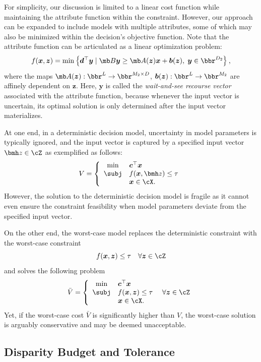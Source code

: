 \documentclass[opre, blindrev]{informs4}
\newcommand{\1}[1]{\mathds{1}{\left(#1\right)}}
\begin{document}
For simplicity, our discussion is limited to a linear cost function while maintaining the attribute function within the constraint. However, our approach can be expanded to include models with multiple attributes, some of which may also be minimized within the decision's objective function. Note that the attribute function can be articulated as a linear optimization problem:
$$
f(\bm x, \bm z) = \min\left\{ \bm d^\top \bm y \;|\; \mb B \bm y \geq \mb A(\bm z) \bm x + \bm b(\bm z), \; \bm y \in \bbr^{D_2} \right\},
$$
where the maps $\mb A(\bm z):\bbr^{L}\rightarrow \bbr^{M_2\times D}$, $\bm b(\bm z):\bbr^{L}\rightarrow \bbr^{M_2}$ are affinely dependent on $\bm z$. Here, $\bm y$ is called the \textit{wait-and-see recourse vector} associated with the attribute function, because whenever the input vector is uncertain, its optimal solution is only determined after the input vector materializes.  

At one end, in a deterministic decision model, uncertainty in model parameters is typically ignored, and the input vector is captured by a specified input vector $\bmh z \in \cZ$ as exemplified as follows:
\begin{equation}
\label{mod:DetermisticModel}
V = \left\{
\begin{array}{cl}
\min & \bm c^\top \bm x \\
\subj & f(\bm x,\bmh z) \leq \tau \\
&\bm x \in \cX.
\end{array}
\right.
\end{equation}
However, the solution to the deterministic decision model is fragile as it cannot even ensure the constraint feasibility when model parameters deviate from the specified input vector. 

On the other end, the worst-case model replaces the deterministic constraint with the worst-case constraint
\[
f(\bm x, \bm z) \leq \tau ~~~\forall \bm z \in \cZ
\]
and solves the following problem 
$$
\bar V = \left\{
\begin{array}{cll}
\min & \bm c^\top \bm x \\
\subj & f(\bm x,\bm z) \leq \tau &~\forall \bm z \in \cZ \\
&\bm x \in \cX.
\end{array}
\right.
$$
Yet, if the worst-case cost $\bar V$ is significantly higher than $V$, the worst-case solution is arguably conservative and may be deemed unacceptable. 

\subsection*{Disparity Budget and Tolerance}
\end{document}
